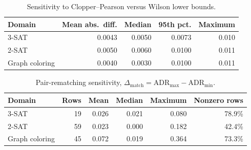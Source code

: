 \documentclass[acmsmall,screen,review,anonymous]{acmart}
\begin{document}
\begin{table}[t]
\centering
\caption{Strict pairwise model-ordering discordance with the witness reference. Each cell is discordant/strict-comparable pairs; source-precision ties are excluded.}
\label{tab:supp-rank-discordance}
\renewcommand{\arraystretch}{1.08}
\end{table}

\begin{table}[t]
\centering
\caption{Sensitivity to Clopper--Pearson versus Wilson lower bounds.}
\label{tab:supp-interval}
\renewcommand{\arraystretch}{1.08}
\begin{tabular}{lrrrr}
\toprule
Domain & Mean abs.\ diff. & Median & 95th pct. & Maximum\\
\midrule
3-SAT & 0.0043 & 0.0050 & 0.0073 & 0.010 \\
2-SAT & 0.0050 & 0.0060 & 0.0100 & 0.011 \\
Graph coloring & 0.0040 & 0.0030 & 0.0100 & 0.011 \\
\bottomrule
\end{tabular}
\end{table}

\begin{table}[t]
\centering
\caption{Pair-rematching sensitivity, $\Delta_{\mathrm{match}}=\mathrm{ADR}_{\max}-\mathrm{ADR}_{\min}$.}
\label{tab:supp-pair-summary}
\renewcommand{\arraystretch}{1.08}
\begin{tabular}{lrrrrr}
\toprule
Domain & Rows & Mean & Median & Maximum & Nonzero rows\\
\midrule
3-SAT & 19 & 0.026 & 0.021 & 0.080 & 78.9\% \\
2-SAT & 59 & 0.023 & 0.000 & 0.182 & 42.4\% \\
Graph coloring & 45 & 0.072 & 0.019 & 0.364 & 73.3\% \\
\bottomrule
\end{tabular}
\end{table}
\end{document}
